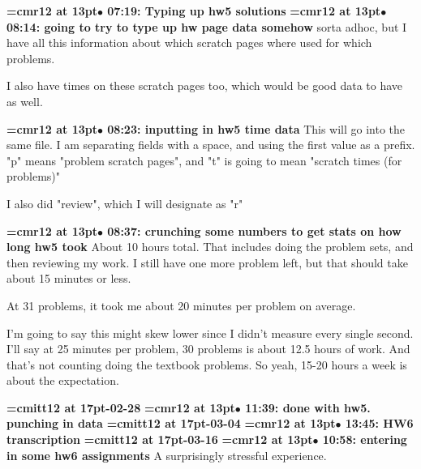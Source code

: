 {\smallskip\noindent\bf\font\titlefont=cmr12 at 13pt\titlefont $\bullet$ 07:19: Typing up hw5 solutions}\smallskip
{\smallskip\noindent\bf\font\titlefont=cmr12 at 13pt\titlefont $\bullet$ 08:14: going to try to type up hw page data somehow}\smallskip
sorta adhoc, but I have all this information about which scratch pages where used for which problems.
\par

I also have times on these scratch pages too, which would be good data to have as well.
\par

{\smallskip\noindent\bf\font\titlefont=cmr12 at 13pt\titlefont $\bullet$ 08:23: inputting in hw5 time data}\smallskip
This will go into the same file. I am separating fields with a space, and using the first value as a prefix. "p" means "problem scratch pages", and "t" is going to mean "scratch times (for problems)"
\par

I also did "review", which I will designate as "r"
\par

{\smallskip\noindent\bf\font\titlefont=cmr12 at 13pt\titlefont $\bullet$ 08:37: crunching some numbers to get stats on how long hw5 took}\smallskip
About 10 hours total. That includes doing the problem sets, and then reviewing my work. I still have one more problem left, but that should take about 15 minutes or less.
\par

At 31 problems, it took me about 20 minutes per problem on average.
\par

I'm going to say this might skew lower since I didn't measure every single second. I'll say at 25 minutes per problem, 30 problems is about 12.5 hours of work. And that's not counting doing the textbook problems. So yeah, 15-20 hours a week is about the expectation.
\par

{\medskip\noindent\bf\font\titlefont=cmitt12 at 17pt-02-28}\medskip
{\smallskip\noindent\bf\font\titlefont=cmr12 at 13pt\titlefont $\bullet$ 11:39: done with hw5. punching in data}\smallskip
{\medskip\noindent\bf\font\titlefont=cmitt12 at 17pt-03-04}\medskip
{\smallskip\noindent\bf\font\titlefont=cmr12 at 13pt\titlefont $\bullet$ 13:45: HW6 transcription}\smallskip
{\medskip\noindent\bf\font\titlefont=cmitt12 at 17pt-03-16}\medskip
{\smallskip\noindent\bf\font\titlefont=cmr12 at 13pt\titlefont $\bullet$ 10:58: entering in some hw6 assignments}\smallskip
A surprisingly stressful experience.
\par

